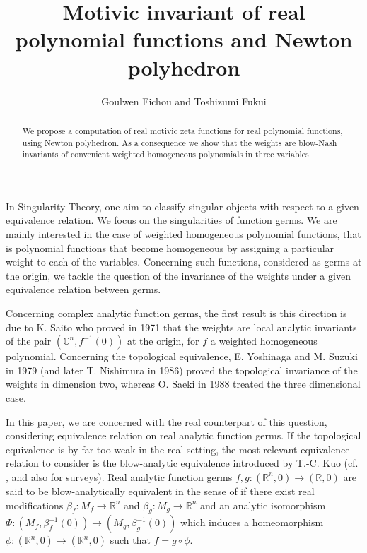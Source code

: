 \documentclass[12pt,a4paper,leqno]{amsart}
\title{Motivic invariant of real polynomial functions and Newton polyhedron}
\author{Goulwen Fichou and Toshizumi Fukui}
\theoremstyle{definition}
\begin{document}
\begin{abstract} We propose a computation of real motivic zeta
  functions for real polynomial functions, using Newton polyhedron.
As a consequence we show that the weights are blow-Nash invariants of
convenient weighted homogeneous polynomials in three variables.
\end{abstract}
\maketitle

In Singularity Theory, one aim to classify singular objects with
respect to a given equivalence relation. We focus on the singularities of
function germs. We are mainly interested in the case of weighted
homogeneous polynomial functions, that is polynomial functions that
become homogeneous by assigning a particular weight to each of the
variables. Concerning such functions, considered as germs at the
origin, we tackle the question of the invariance of the weights under
a given equivalence relation between germs.

Concerning complex analytic function germs, the first result is this
direction is due to K. Saito \cite{Saito} who proved in 1971 that the weights
are local analytic invariants of the pair $(\mathbb C^n,f^{-1}(0))$ at
the origin, for $f$ a weighted homogeneous polynomial. Concerning the
topological equivalence, E. Yoshinaga and M. Suzuki \cite{YoSu} in
1979 (and later T. Nishimura \cite{Ni} in 1986) proved the topological
invariance of the weights in dimension two, whereas O. Saeki
\cite{Saeki} in 1988 treated the three dimensional case.

In this paper, we are concerned with the real counterpart of this
question, considering equivalence relation on real analytic function germs. If the topological
equivalence is by far too weak in the real setting, the most relevant
equivalence relation to consider is the blow-analytic equivalence introduced by
T.-C. Kuo (cf. \cite{Kuo}, and also \cite{FKK,FP} for surveys). Real analytic function germs
$f,g:(\mathbb R^n,0)\longrightarrow (\mathbb R,0)$ are said to be
blow-analytically equivalent in the sense of \cite{Kuo} if
there exist real modifications $\beta_f:M_f \longrightarrow \mathbb R^n$
and $\beta_g:M_g \longrightarrow \mathbb R^n$ and an analytic
isomorphism $\Phi :(M_f, \beta_f^{-1}(0)) \longrightarrow (M_g,
\beta_g^{-1}(0))$ which induces a homeomorphism $\phi:(\mathbb R^n,0)
\longrightarrow  (\mathbb R^n,0)$ such that $f=g \circ \phi$. 
\end{document}
